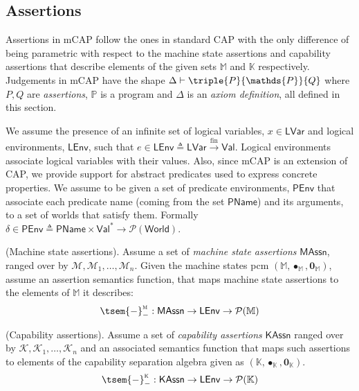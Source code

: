 \subsection{Assertions}

Assertions in mCAP follow the ones in standard CAP with the only difference of being parametric with respect to the machine state assertions and capability assertions that describe elements of the given sets $\mathbb{M}$ and $\mathbb{K}$ respectively. Judgements in mCAP have the shape $\Delta \vdash \triple{P}{\mathds{P}}{Q}$ where $P, Q$ are \textit{assertions}, $\mathds{P}$ is a program and $\Delta$ is an \textit{axiom definition}, all defined in this section.

We assume the presence of an infinite set of logical variables, $x \in \mathsf{LVar}$ and logical environments, $\mathsf{LEnv}$, such that $e \in \mathsf{LEnv} \triangleq \mathsf{LVar} \xrightarrow{\text{fin}} \mathsf{Val}$. Logical environments associate logical variables with their values. Also, since mCAP is an extension of CAP, we provide support for abstract predicates used to express concrete properties. We assume to be given a set of predicate environments, $\mathsf{PEnv}$ that associate each predicate name (coming from the set $\mathsf{PName}$) and its arguments, to a set of worlds that satisfy them. Formally $\delta \in \mathsf{PEnv} \triangleq \mathsf{PName} \times \mathsf{Val}^* \rightarrow \mathcal{P}(\mathsf{World})$.

\begin{param}
	(Machine state assertions).
	Assume a set of \emph{machine state assertions} $\mathsf{MAssn}$, ranged over by $\mathcal{M}, \mathcal{M}_1, \ldots, \mathcal{M}_n$. Given the machine states pcm $(\mathbb{M}, \bullet_\mathbb{M}, \mathbf{0}_\mathbb{M})$, assume an assertion semantics function, that maps machine state assertions to the elements of $\mathbb{M}$ it describes:
	\[
		\tsem{-}_-^\textsc{m} : \mathsf{MAssn} \rightarrow \mathsf{LEnv} \rightarrow \mathcal{P}(\mathbb{M})
	\]
\end{param}

\begin{param}
	(Capability assertions).
	Assume a set of \emph{capability assertions} $\mathsf{KAssn}$ ranged over by $\mathcal{K}, \mathcal{K}_1, \ldots, \mathcal{K}_n$ and an associated semantics function that maps such assertions to elements of the capability separation algebra given as $(\mathbb{K}, \bullet_\mathbb{K}, \mathbf{0}_\mathbb{K})$.
	\[
		\tsem{-}_-^\textsc{k} : \mathsf{KAssn} \rightarrow \mathsf{LEnv} \rightarrow \mathcal{P}(\mathbb{K})
	\]
\end{param}


